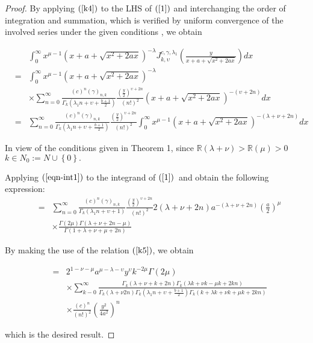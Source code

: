 \documentclass{amsart}
\theoremstyle{plain}
\numberwithin{equation}{section}
\begin{document}
\begin{proof}
By applying $\left( \ref{k4}\right) $ to the LHS of $\left( \ref{1}\right) $
and interchanging the order of integration and summation, which is verified
by uniform convergence of the involved series under the given conditions ,
we obtain

\begin{eqnarray*}
&&\int_{0}^{\infty }x^{\mu -1}\left( x+a+\sqrt{x^{2}+2ax}\right) ^{-\lambda
}J_{k,\upsilon }^{c,\gamma ,\lambda _{1}}\left( \frac{y}{x+a+\sqrt{x^{2}+2ax}}\right) dx \\
&=&\int_{0}^{\infty }x^{\mu -1}\left( x+a+\sqrt{x^{2}+2ax}\right) ^{-\lambda
} \\
&&\times \sum_{n=0}^{\infty }\frac{\left( c\right) ^{n}\left( \gamma \right)
_{n,k}}{\Gamma _{k}\left( \lambda _{1}n+\upsilon +\frac{b+1}{2}\right) }\frac{\left( \frac{y}{2}\right) ^{\upsilon +2n}}{\left( n!\right) ^{2}}\left( x+a+\sqrt{x^{2}+2ax}\right) ^{-\left( \upsilon +2n\right) }dx \\
&=&\sum_{n=0}^{\infty }\frac{\left( c\right) ^{n}\left( \gamma \right) _{n,k}}{\Gamma _{k}\left( \lambda _{1}n+\upsilon +\frac{b+1}{2}\right) }\frac{\left( \frac{y}{2}\right) ^{\upsilon +2n}}{\left( n!\right) ^{2}}\int_{0}^{\infty }x^{\mu -1}\left( x+a+\sqrt{x^{2}+2ax}\right) ^{-\left(
\lambda +\nu +2n\right) }dx
\end{eqnarray*}

In view of the conditions given in Theorem 1, since $\mathbb{R}\left(
\lambda +\nu \right) >\mathbb{R}\left( \mu \right) >0$ $k\in N_{0}:=N\cup
\left\{ 0\right\} .$

Applying $\left( \ref{eqn-int1}\right) $ to the integrand of $\left( \ref{1}\right) $\ and obtain the following expression:\begin{eqnarray*}
&=&\sum_{n=0}^{\infty }\frac{\left( c\right) ^{n}\left( \gamma \right) _{n,k}}{\Gamma _{k}\left( \lambda _{1}n+\upsilon +1\right) }\frac{\left( \frac{y}{2}\right) ^{\upsilon +2n}}{\left( n!\right) ^{2}}2\left( \lambda +\nu
+2n\right) a^{-\left( \lambda +\nu +2n\right) }\left( \frac{a}{2}\right)
^{\mu } \\
&&\times \frac{\Gamma \left( 2\mu \right) \Gamma \left( \lambda +\nu +2n-\mu
\right) }{\Gamma \left( 1+\lambda +\nu +\mu +2n\right) }
\end{eqnarray*}

By making the use of the relation $\left( \ref{k5}\right) $, we obtain

\begin{eqnarray*}
&=&2^{1-\nu -\mu }a^{\mu -\lambda -\upsilon }y^{\upsilon }k^{-2\mu }\Gamma
\left( 2\mu \right)  \\
&&\times \sum_{k-0}^{\infty }\frac{\Gamma _{k}\left( \lambda +\nu
+k+2n\right) \Gamma _{k}\left( \lambda k+\nu k-\mu k+2kn\right) }{\Gamma
_{k}\left( \lambda +\nu 2n\right) \Gamma _{k}\left( \lambda _{1}n+\upsilon +\frac{b+1}{2}\right) \Gamma _{k}\left( k+\lambda k+\nu k+\mu k+2kn\right) }
\\
&&\times \frac{\left( c\right) ^{n}}{\left( n!\right) ^{2}}\left( \frac{y^{2}}{4a^{2}}\right) ^{n}
\end{eqnarray*}

which is the desired result.
\end{proof}
\end{document}
